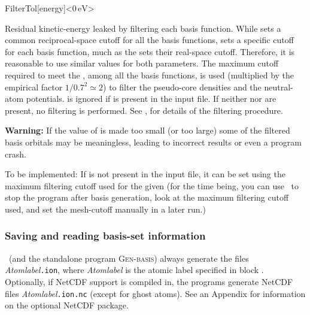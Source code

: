 \begin{fdfentry}{FilterTol}[energy]<$0\,\mathrm{eV}$>

  Residual kinetic-energy leaked by filtering each basis function.
  While  sets a common reciprocal-space cutoff for
  all the basis functions,  sets a specific cutoff for
  each basis function, much as the  sets their
  real-space cutoff. Therefore, it is reasonable to use similar values
  for both parameters.  The maximum cutoff required to meet the
  , among all the basis functions, is used (multiplied
  by the empirical factor $1/0.7^2 \simeq 2$) to filter the
  pseudo-core densities and the neutral-atom
  potentials.  is ignored if  is
  present in the input file.  If neither  nor
   are present, no filtering is performed.  See
  \citet{SOLER20091134}, for details of the filtering procedure.

  \textbf{Warning:} If the value of  is made too
  small (or  too large) some of the filtered basis
  orbitals may be meaningless, leading to incorrect results or even a
  program crash.

  To be implemented: If  is not present in the
  input file, it can be set using the maximum filtering cutoff used
  for the given  (for the time being, you can use
   \fdftrue\ to stop the program after basis generation,
  look at the maximum filtering cutoff used, and set the mesh-cutoff
  manually in a later run.)

\end{fdfentry}



\subsubsection{Saving and reading basis-set information}

\siesta\ (and the standalone program \textsc{Gen-basis})
always generate the files
\textit{Atomlabel}\texttt{.ion}, where \textit{Atomlabel} is the atomic label
specified in block .  Optionally, if
NetCDF support is compiled in, the programs generate
NetCDF files 
\textit{Atomlabel}\texttt{.ion.nc} (except for ghost atoms).
See an Appendix for information on the optional NetCDF package.

